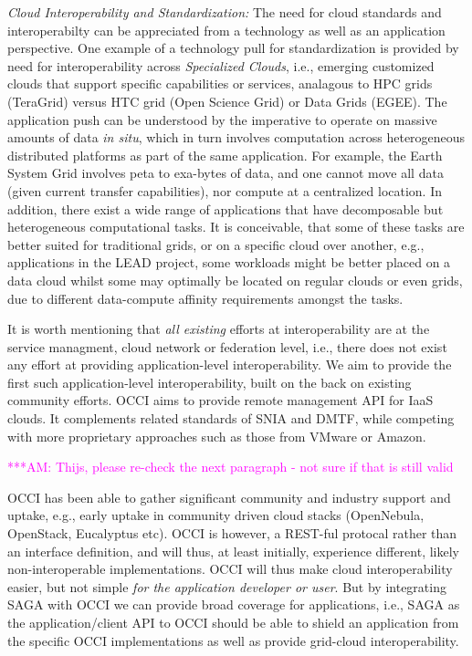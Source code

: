 \documentclass[10pt,conference,final,letterpaper,twoside,twocolumn,]{IEEEtran}
\newcommand{\amnote}[1]{  {\textcolor{magenta} {***AM: #1}}}
\newcommand{\amnote}[1]{}
\begin{document}
{\it Cloud Interoperability and Standardization:} The need for cloud
standards and interoperabilty can be appreciated from a technology as
well as an application perspective. One example of a technology pull
for standardization is provided by need for interoperability across
{\it Specialized Clouds}, i.e., emerging customized clouds that
support specific capabilities or services, analagous to HPC grids
(TeraGrid) versus HTC grid (Open Science Grid) or Data Grids (EGEE).
The application push can be understood by the imperative to operate on
massive amounts of data {\it in situ}, which in turn involves
computation across heterogeneous distributed platforms as part of the
same application.  For example, the Earth System Grid involves peta to
exa-bytes of data, and one cannot move all data (given current
transfer capabilities), nor compute at a centralized location.  In
addition, there exist a wide range of applications that have
decomposable but heterogeneous computational tasks. It is conceivable,
that some of these tasks are better suited for traditional grids, or
on a specific cloud over another, e.g., applications in the LEAD
project, some workloads might be better placed on a data cloud whilst
some may optimally be located on regular clouds or even grids, due to
different data-compute affinity requirements amongst the tasks.

It is worth mentioning that {\it all existing} efforts at
interoperability are at the service managment, cloud network or
federation level, i.e., there does not exist any effort at providing
application-level interoperability. We aim to provide the first such
application-level interoperability, built on the back on existing
community efforts.  OCCI aims to provide remote management API for
IaaS clouds. It complements related standards of SNIA and DMTF, while
competing with more proprietary approaches such as those from VMware
or Amazon.  

\amnote{Thijs, please re-check the next paragraph - not sure if that
is still valid}

OCCI has been able to gather significant community and industry
support and uptake, e.g., early uptake in community driven cloud
stacks (OpenNebula, OpenStack, Eucalyptus etc).  OCCI is however, a
REST-ful protocal rather than an interface definition, and will thus,
at least initially, experience different, likely non-interoperable
implementations.  OCCI will thus make cloud interoperability easier,
but not simple {\it for the application developer or user}.  But by
integrating SAGA with OCCI we can provide broad coverage for
applications, i.e., SAGA as the application/client API to OCCI should
be able to shield an application from the specific OCCI
implementations as well as provide grid-cloud interoperability.
\end{document}
